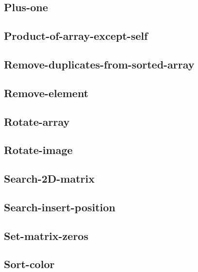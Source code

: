\documentclass[a4paper,10pt]{article}
\begin{document}
\begin{CJK}{UTF8}{gbsn}
\subsection{Plus-one}


\subsection{Product-of-array-except-self}


\subsection{Remove-duplicates-from-sorted-array}


\subsection{Remove-element}


\subsection{Rotate-array}


\subsection{Rotate-image}


\subsection{Search-2D-matrix}


\subsection{Search-insert-position}


\subsection{Set-matrix-zeros}


\subsection{Sort-color}



\end{CJK}
\end{document}
